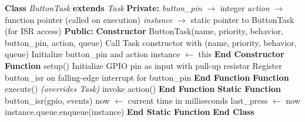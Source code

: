 \documentclass[a4paper,11pt]{article}
\begin{document}
\begin{algorithm}
\caption{ButtonTask Class (GPIO Interrupt-Driven Task)}
\begin{algorithmic}[1]
\State \textbf{Class} \textit{ButtonTask} \textbf{extends} \textit{Task}
\State \hspace{0.5cm} \textbf{Private:}
\State \hspace{1cm} \textit{button\_pin} $\rightarrow$ integer
\State \hspace{1cm} \textit{action} $\rightarrow$ function pointer (called on execution)
\State \hspace{1cm} \textit{instance} $\rightarrow$ static pointer to ButtonTask (for ISR access)
\State \hspace{0.5cm} \textbf{Public:}
\State \hspace{1cm} \textbf{Constructor} ButtonTask(name, priority, behavior, button\_pin, action, queue)
\State \hspace{1.5cm} Call Task constructor with (name, priority, behavior, queue)
\State \hspace{1.5cm} Initialize button\_pin and action
\State \hspace{1.5cm} instance $\leftarrow$ this
\State \hspace{1cm} \textbf{End Constructor}
\vspace{0.3cm}
\State \hspace{1cm} \textbf{Function} setup()
\State \hspace{1.5cm} Initialize GPIO pin as input with pull-up resistor
\State \hspace{1.5cm} Register button\_isr on falling-edge interrupt for button\_pin
\State \hspace{1cm} \textbf{End Function}
\vspace{0.3cm}
\State \hspace{1cm} \textbf{Function} execute() \textit{(overrides Task)}
\State \hspace{1.5cm}  invoke action() \EndIf
\State \hspace{1cm} \textbf{End Function}
\vspace{0.3cm}
\State \hspace{1cm} \textbf{Static Function} button\_isr(gpio, events)
\State \hspace{1.5cm} now $\leftarrow$ current time in milliseconds
\State \hspace{1.5cm}  \Return \EndIf
\State \hspace{1.5cm} last\_press $\leftarrow$ now
\State \hspace{1.5cm} instance.queue.enqueue(instance) \quad 
\State \hspace{1cm} \textbf{End Static Function}
\State \textbf{End Class}
\end{algorithmic}
\end{algorithm}
\end{document}
